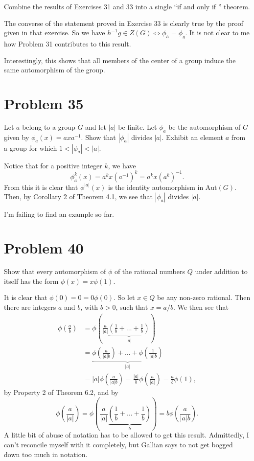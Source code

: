 \documentclass[12pt]{article}
\newcommand{\aut}{\mbox{Aut}}
\begin{document}
Combine the results of Exercises 31 and 33 into a single ``if and only if '' theorem.

The converse of the statement proved in Exercise 33 is clearly true by the proof
given in that exercise.  So we have $h^{-1}g\in Z(G)\iff\phi_h=\phi_g$.
It is not clear to me how Problem 31 contributes to this result.

Interestingly, this shows that all members of the center of a group induce
the same automorphism of the group.

\section*{Problem 35}

Let $a$ belong to a group $G$ and let $|a|$ be finite.  Let $\phi_a$ be the automorphism
of $G$ given by $\phi_a(x)=axa^{-1}$.  Show that $|\phi_a|$ divides $|a|$.
Exhibit an element $a$ from a group for which $1<|\phi_a|<|a|$.

Notice that for a positive integer $k$, we have
\begin{equation*}
\phi_a^k(x) = a^kx(a^{-1})^k=a^kx(a^k)^{-1}.
\end{equation*}
From this it is clear that $\phi^{|a|}(x)$ is the identity automorphism in $\aut(G)$.
Then, by Corollary 2 of Theorem 4.1, we see that $|\phi_a|$ divides $|a|$.

I'm failing to find an example so far.

\section*{Problem 40}

Show that every automorphism of $\phi$ of the rational numbers $Q$ under
addition to itself has the form $\phi(x)=x\phi(1)$.

It is clear that $\phi(0)=0=0\phi(0)$.  So let $x\in Q$ be any non-zero rational.
Then there are integers $a$ and $b$, with $b>0$, such that $x=a/b$.  We then
see that
\begin{align*}
\phi\left(\frac{a}{b}\right)&=\phi\left(\frac{a}{|a|}\underbrace{\left(\frac{1}{b}+\dots+\frac{1}{b}\right)}_{|a|}\right) \\
 &= \underbrace{\phi\left(\frac{a}{|a|b}\right)+\dots+\phi\left(\frac{1}{|a|b}\right)}_{|a|} \\
 &= |a|\phi\left(\frac{a}{|a|b}\right) = \frac{|a|}{b}\phi\left(\frac{a}{|a|}\right)=\frac{a}{b}\phi(1),
\end{align*}
by Property 2 of Theorem 6.2, and by
\begin{equation*}
\phi\left(\frac{a}{|a|}\right)=
\phi\left(
\frac{a}{|a|}\underbrace{\left(\frac{1}{b}+\dots+\frac{1}{b}\right)}_b\right)=b\phi\left(\frac{a}{|a|b}\right).
\end{equation*}
A little bit of abuse of notation has to be allowed to get this result.  Admittedly,
I can't reconcile myself with it completely, but Gallian says to not get bogged down
too much in notation.
\end{document}
